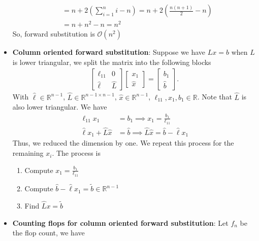 \documentclass{report}
\begin{document}
\begin{itemize}
\begin{align*}
                   &= n + 2 \left(\sum_{i=1}^{n}i - n\right) = n+ 2 \left(\frac{n(n+1)}{2}-n\right) \\
                   &=n + n^{2} - n = n^{2}
            \end{align*}
            So, forward substitution is $\mathcal{O}(n^{2})$
        \item \textbf{Column oriented forward substitution}: Suppose we have $Lx = b$ when $L$ is lower triangular, we split the matrix into the following blocks
            \begin{align*}
                \begin{bmatrix}
                    \ell_{11} & 0 \\
                    \hat{\ell} & \hat{L}
                \end{bmatrix}
                \begin{bmatrix}
                    x_{1} \\ \hat{x} 
                \end{bmatrix}
                = \begin{bmatrix}
                    b_{1} \\ \hat{b}
                \end{bmatrix}
            .\end{align*}
            With $\hat{\ell} \in \mathbb{R}^{n-1}$, $\hat{L} \in \mathbb{R}^{n-1 \times n-1} $, $\hat{x} \in \mathbb{R}^{n-1}$, $\ell_{11}, x_{1}, b_{1} \in \mathbb{R}$. Note that $\hat{L}$ is also lower triangular.
            \bigbreak \noindent 
            We have
            \begin{align*}
                \ell_{11}x_{1} &= b_{1} \implies x_{1} = \frac{b_{1}}{\ell_{11}} \\
                \hat{\ell}x_{1} + \hat{L}\hat{x} &= \hat{b} \implies \hat{L}\hat{x} = \hat{b} - \hat{\ell}x_{1}
            \end{align*}
            Thus, we reduced the dimension by one. We repeat this process for the remaining $x_{i}$. The process is 
            \begin{enumerate}
                \item Compute $x_{1} = \frac{b_{1}}{\ell_{11}} $
                \item Compute $\hat{b} - \hat{\ell}x_{1} = \tilde{b} \in \mathbb{R}^{n-1} $
                \item Find $\hat{L}x = \tilde{b} $
            \end{enumerate}
        \item \textbf{Counting flops for column oriented forward substitution}: Let $f_{n}$ be the flop count, we have

\end{itemize}
\end{document}
